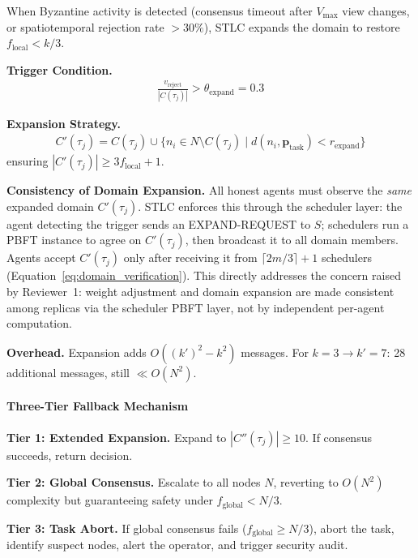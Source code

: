 \documentclass[manuscript,screen,review]{acmart}
\begin{document}
When Byzantine activity is detected (consensus timeout after $V_{\max}$ view changes, or spatiotemporal rejection rate $> 30\%$), STLC expands the domain to restore $f_{\text{local}} < k/3$.

\textbf{Trigger Condition.}
\begin{equation}
\begin{aligned}
\frac{v_{\text{reject}}}{|C(\tau_j)|} > \theta_{\text{expand}}
= 0.3
\label{eq:expansion_trigger}
\end{aligned}
\end{equation}

\textbf{Expansion Strategy.}
\begin{equation}
\begin{aligned}
C'(\tau_j) = C(\tau_j) \cup
\{n_i \in N \setminus C(\tau_j) \mid
d(n_i, \mathbf{p}_{\text{task}}) < r_{\text{expand}}\}
\label{eq:domain_expansion}
\end{aligned}
\end{equation}
ensuring $|C'(\tau_j)| \geq 3f_{\text{local}} + 1$.

\textbf{Consistency of Domain Expansion.}
All honest agents must observe the \emph{same} expanded domain $C'(\tau_j)$. STLC enforces this through the scheduler layer: the agent detecting the trigger sends an EXPAND-REQUEST to $S$; schedulers run a PBFT instance to agree on $C'(\tau_j)$, then broadcast it to all domain members. Agents accept $C'(\tau_j)$ only after receiving it from $\lceil 2m/3 \rceil + 1$ schedulers (Equation~\ref{eq:domain_verification}). This directly addresses the concern raised by Reviewer~1: weight adjustment and domain expansion are made consistent among replicas via the scheduler PBFT layer, not by independent per-agent computation.

\textbf{Overhead.} Expansion adds $O((k')^2 - k^2)$ messages. For $k=3 \to k'=7$: 28 additional messages, still $\ll O(N^2)$.

\paragraph{Three-Tier Fallback Mechanism}
\label{sec:fallback}

\textbf{Tier 1: Extended Expansion.} Expand to $|C''(\tau_j)| \geq 10$. If consensus succeeds, return decision.

\textbf{Tier 2: Global Consensus.} Escalate to all nodes $N$, reverting to $O(N^2)$ complexity but guaranteeing safety under $f_{\text{global}} < N/3$.

\textbf{Tier 3: Task Abort.} If global consensus fails ($f_{\text{global}} \geq N/3$), abort the task, identify suspect nodes, alert the operator, and trigger security audit.
\end{document}

